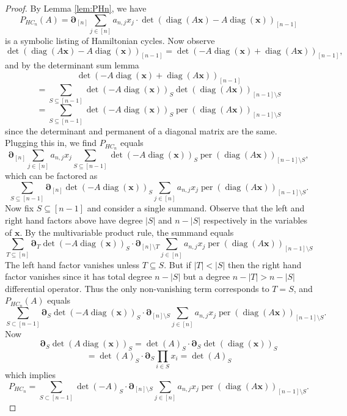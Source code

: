 \documentclass{article}
\newcommand{\diag}{\operatorname{diag}}
\newcommand{\per}{\operatorname{per}}
\theoremstyle{theorem}
\theoremstyle{definition}
\begin{document}
\begin{proof}
    By Lemma \ref{lem:PHn}, we have
    \[
        P_{HC_n}(A)=\boldsymbol{\partial}_{[n]}\sum_{j\in[n]}a_{n,j}x_j\cdot\det(\diag(A\boldsymbol{x})-A\diag(\boldsymbol{x}))_{[n-1]}
    \]
    is a symbolic listing of Hamiltonian cycles. Now observe
    \[
        \det(\diag(A\boldsymbol{x})-A\diag(\boldsymbol{x}))_{[n-1]}=\det(-A\diag(\boldsymbol{x}) + \diag(A\boldsymbol{x}))_{[n-1]},
    \]
    and by the determinant sum lemma
    \[
        \det(-A\diag(\boldsymbol{x}) + \diag(A\boldsymbol{x}))_{[n-1]}
    \]
    \[
        =\sum_{S\subseteq[n-1]}\det(-A\diag(\boldsymbol{x}))_S\det(\diag(A\boldsymbol{x}))_{[n-1]\setminus S}
    \]
    \[
        =\sum_{S\subseteq[n-1]}\det(-A\diag(\boldsymbol{x}))_S\per(\diag(A\boldsymbol{x}))_{[n-1]\setminus S}
    \]
    since the determinant and permanent of a diagonal matrix are the same. Plugging this in, we find $P_{HC_n}$ equals
    \[
        \boldsymbol{\partial}_{[n]}\sum_{j\in[n]}a_{n,j}x_j\sum_{S\subseteq[n-1]}\det(-A\diag(\boldsymbol{x}))_S\per(\diag(A\boldsymbol{x}))_{[n-1]\setminus S},
    \]
    which can be factored as
    \[
        \sum_{S\subseteq[n-1]}\boldsymbol{\partial}_{[n]}\det(-A\diag(\boldsymbol{x}))_S\sum_{j\in[n]}a_{n,j}x_j\per(\diag(A\boldsymbol{x}))_{[n-1]\setminus S}.
    \]
    Now fix $S\subseteq[n-1]$ and consider a single summand. Observe that the left and right hand factors above have degree $|S|$ and $n-|S|$ respectively in the variables of $\boldsymbol{x}$. By the multivariable product rule, the summand equals
    \[
        \sum_{T\subseteq[n]}\boldsymbol{\partial}_{T}\det(-A\diag(\boldsymbol{x}))_S
        \cdot\boldsymbol{\partial}_{[n]\setminus T}\sum_{j\in[n]}a_{n,j}x_j\per(\diag(A\boldsymbol{x}))_{[n-1]\setminus S}
    \]
    The left hand factor vanishes unless $T\subseteq S$. But if $|T|<|S|$ then the right hand factor vanishes since it has total degree $n-|S|$ but a degree $n-|T|>n-|S|$ differential operator. Thus the only non-vanishing term corresponds to $T=S$, and $P_{HC_n}(A)$ equals
    \[
        \sum_{S\subset[n-1]}\boldsymbol{\partial}_{S}\det(-A\diag(\boldsymbol{x}))_S \cdot \boldsymbol{\partial}_{[n]\setminus S}\sum_{j\in[n]}a_{n,j}x_j\per(\diag(A\boldsymbol{x}))_{[n-1]\setminus S}.
    \]
    Now
    \[
        \boldsymbol{\partial}_{S}\det(A\diag(\boldsymbol{x}))_S=\det(A)_S\cdot\boldsymbol{\partial}_S\det(\diag(\boldsymbol{x}))_S
    \]
    \[
        =\det(A)_S\cdot\boldsymbol{\partial}_{S}\prod_{i\in S}x_i=\det(A)_S
    \]
    which implies
    \[
        P_{HC_n}=\sum_{S\subset[n-1]}\det(-A)_S\cdot\boldsymbol{\partial}_{[n]\setminus S}\sum_{j\in[n]}a_{n,j}x_j\per(\diag(A\boldsymbol{x}))_{[n-1]\setminus S}.
\]
\end{proof}
\end{document}
